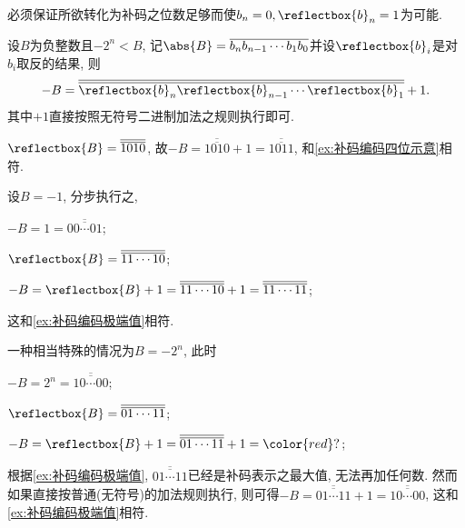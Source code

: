 \documentclass{ctexart}
\begin{document}
\begin{pitfall}
    必须保证所欲转化为补码之位数足够而使$b_n=0, \reflectbox{b}_n=1$为可能.
\end{pitfall}
\begin{finale}
    \begin{theorem}
        设$B$为负整数且$-2^n < B$, 记$\abs{B} = \overline{b_n b_{n-1} \cdots b_1 b_0}$并设$\reflectbox{b}_i$是对$b_i$取反的结果, 则
        \[ -B = \overline{\overline{\reflectbox{b}_n \reflectbox{b}_{n-1} \cdots \reflectbox{b}_1}} + 1. \]
        其中$+1$直接按照无符号二进制加法之规则执行即可.
    \end{theorem}
\end{finale}
\begin{sample}
    \begin{ex}
        $\reflectbox{B} = \overline{\overline{1010}}$, 故$-B = \overline{\overline{1010}} + 1 = \overline{\overline{1011}}$, 和\cref{ex:补码编码四位示意}相符.
    \end{ex}
\end{sample}
\begin{sample}
    \begin{ex}
        设$B = -1$, 分步执行之,
        \begin{cenum}
            \item $-B = 1 = \overline{\overline{00\cdots 01}}$;
            \item $\reflectbox{B} = \overline{\overline{11\cdots 10}}$;
            \item $-B = \reflectbox{B} + 1 = \overline{\overline{11\cdots 10}} + 1 = \overline{\overline{11\cdots 11}}$;
        \end{cenum}
        这和\cref{ex:补码编码极端值}相符.
    \end{ex}
\end{sample}
\begin{sample}
    \begin{ex}
        \label{ex:极端负数之补码表示}
        一种相当特殊的情况为$B = -2^n$, 此时
        \begin{cenum}
            \item $-B = 2^n = \overline{\overline{10\cdots 00}}$;
            \item $\reflectbox{B} = \overline{\overline{01\cdots 11}}$;
            \item $-B = \reflectbox{B} + 1 = \overline{\overline{01\cdots 11}} + 1 = {\color{red}?}$;
        \end{cenum}
        根据\cref{ex:补码编码极端值}, $\overline{\overline{01\cdots 11}}$已经是补码表示之最大值, 无法再加任何数. 然而如果直接按普通(无符号)的加法规则执行, 则可得$-B = \overline{\overline{01\cdots 11}} + 1 = \overline{\overline{10\cdots 00}}$, 这和\cref{ex:补码编码极端值}相符.
    \end{ex}
\end{sample}
\end{document}
